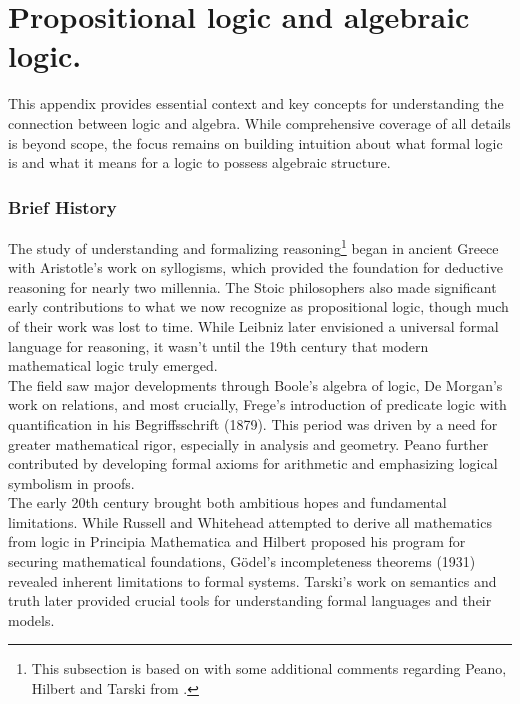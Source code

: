 \chapter{Propositional logic and algebraic logic.}

This appendix provides essential context and key concepts for understanding the connection between logic and algebra. While comprehensive coverage of all details is beyond scope, the focus remains on building intuition about what formal logic is and what it means for a logic to possess algebraic structure. 

\subsection*{Brief History}

The study of understanding and formalizing reasoning\footnote{This subsection is based on \cite[p.~5-8]{ConciseLogicBook} with some additional comments regarding Peano, Hilbert and Tarski from \cite{MathLogicBook}.} began in ancient Greece with Aristotle's work on syllogisms, which provided the foundation for deductive reasoning for nearly two millennia. The Stoic philosophers also made significant early contributions to what we now recognize as propositional logic, though much of their work was lost to time. While Leibniz later envisioned a universal formal language for reasoning, it wasn't until the 19th century that modern mathematical logic truly emerged.\\

The field saw major developments through Boole's algebra of logic, De Morgan's work on relations, and most crucially, Frege's introduction of predicate logic with quantification in his Begriffsschrift (1879). This period was driven by a need for greater mathematical rigor, especially in analysis and geometry. Peano further contributed by developing formal axioms for arithmetic and emphasizing logical symbolism in proofs.\\

The early 20th century brought both ambitious hopes and fundamental limitations. While Russell and Whitehead attempted to derive all mathematics from logic in Principia Mathematica and Hilbert proposed his program for securing mathematical foundations, Gödel's incompleteness theorems (1931) revealed inherent limitations to formal systems. Tarski's work on semantics and truth later provided crucial tools for understanding formal languages and their models.\\


